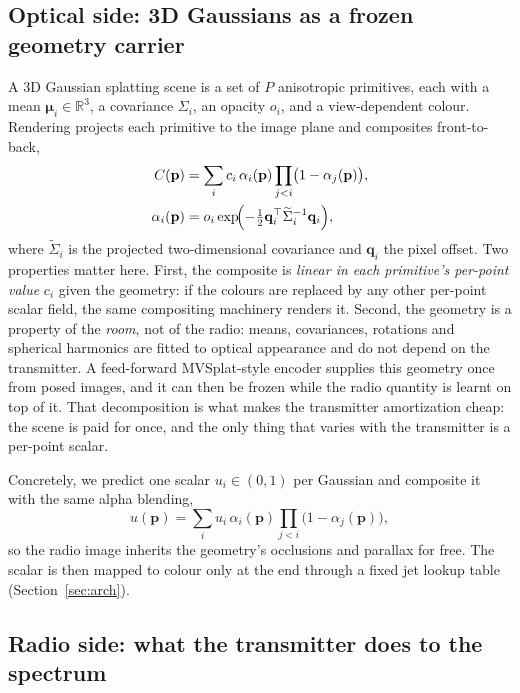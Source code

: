 \documentclass[conference]{IEEEtran}
\begin{document}
\subsection{Optical side: 3D Gaussians as a frozen geometry carrier}

A 3D Gaussian splatting scene \cite{3dgs} is a set of $P$ anisotropic
primitives, each with a mean $\boldsymbol{\mu}_i\in\mathbb{R}^3$, a covariance
$\Sigma_i$, an opacity $o_i$, and a view-dependent colour. Rendering projects
each primitive to the image plane and composites front-to-back,
\begin{equation}
\begin{aligned}
C(\mathbf{p})&=\sum_{i} c_i\,\alpha_i(\mathbf{p})
\prod_{j<i}\bigl(1-\alpha_j(\mathbf{p})\bigr),\\
\alpha_i(\mathbf{p})&=o_i\exp\!\Bigl(-\tfrac12
\mathbf{q}_i^{\top}\widetilde\Sigma_i^{-1}\mathbf{q}_i\Bigr),
\end{aligned}
\end{equation}
where $\widetilde\Sigma_i$ is the projected two-dimensional covariance and
$\mathbf{q}_i$ the pixel offset. Two properties matter here. First, the
composite is \emph{linear in each primitive's per-point value} $c_i$ given the
geometry: if the colours are replaced by any other per-point scalar field, the
same compositing machinery renders it. Second, the geometry is a property of
the \emph{room}, not of the radio: means, covariances, rotations and spherical
harmonics are fitted to optical appearance and do not depend on the transmitter.
A feed-forward MVSplat-style encoder \cite{mvsplat} supplies this geometry once
from posed images, and it can then be frozen while the radio quantity is
learnt on top of it. That decomposition is what makes the transmitter
amortization cheap: the scene is paid for once, and the only thing that varies
with the transmitter is a per-point scalar.

Concretely, we predict one scalar $u_i\in(0,1)$ per Gaussian and composite it
with the same alpha blending,
\begin{equation}
u(\mathbf{p})=\sum_i u_i\,\alpha_i(\mathbf{p})
\prod_{j<i}\bigl(1-\alpha_j(\mathbf{p})\bigr),
\end{equation}
so the radio image inherits the geometry's occlusions and parallax for free.
The scalar is then mapped to colour only at the end through a fixed jet lookup
table (Section~\ref{sec:arch}).

\subsection{Radio side: what the transmitter does to the spectrum}
\end{document}
